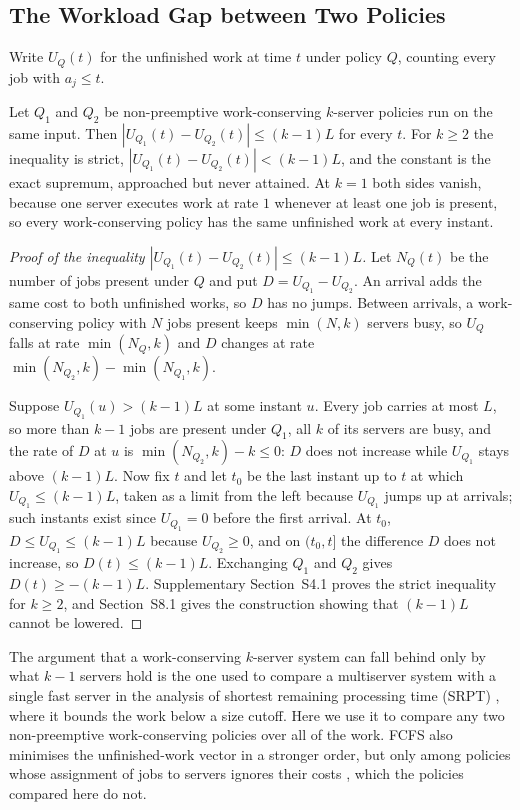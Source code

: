 \subsection{The Workload Gap between Two Policies}
\label{sec:th_gap}

Write $U_Q(t)$ for the unfinished work at time $t$ under policy $Q$, counting every job
with $a_j \le t$.

\begin{lemma}
\label{lem:gap}
Let $Q_1$ and $Q_2$ be non-preemptive work-conserving $k$-server policies run on the same
input. Then $|U_{Q_1}(t) - U_{Q_2}(t)| \le (k-1)L$ for every $t$. For $k \ge 2$ the
inequality is strict, $|U_{Q_1}(t) - U_{Q_2}(t)| < (k-1)L$, and the constant is the exact
supremum, approached but never attained. At $k = 1$ both sides vanish, because one server
executes work at rate $1$ whenever at least one job is present, so every work-conserving
policy has the same unfinished work at every instant.
\end{lemma}

\begin{proof}[Proof of the inequality $|U_{Q_1}(t) - U_{Q_2}(t)| \le (k-1)L$]
Let $N_Q(t)$ be the number of jobs present under $Q$ and put $D = U_{Q_1} - U_{Q_2}$. An
arrival adds the same cost to both unfinished works, so $D$ has no jumps. Between arrivals,
a work-conserving policy with $N$ jobs present keeps $\min(N, k)$ servers busy, so $U_Q$
falls at rate $\min(N_Q, k)$ and $D$ changes at rate $\min(N_{Q_2}, k) - \min(N_{Q_1}, k)$.

Suppose $U_{Q_1}(u) > (k-1)L$ at some instant $u$. Every job carries at most $L$, so more
than $k-1$ jobs are present under $Q_1$, all $k$ of its servers are busy, and the rate of
$D$ at $u$ is $\min(N_{Q_2}, k) - k \le 0$: $D$ does not increase while $U_{Q_1}$ stays above
$(k-1)L$. Now fix $t$ and let $t_0$ be the last instant up to $t$ at which
$U_{Q_1} \le (k-1)L$, taken as a limit from the left because $U_{Q_1}$ jumps up at
arrivals; such instants exist since $U_{Q_1} = 0$ before the first arrival. At $t_0$,
$D \le U_{Q_1} \le (k-1)L$ because $U_{Q_2} \ge 0$, and on $(t_0, t]$ the difference $D$
does not increase, so $D(t) \le (k-1)L$. Exchanging $Q_1$ and $Q_2$ gives
$D(t) \ge -(k-1)L$. Supplementary Section~S4.1 proves the strict inequality for $k \ge 2$,
and Section~S8.1 gives the construction showing that $(k-1)L$ cannot be lowered.
\end{proof}

The argument that a work-conserving $k$-server system can fall behind only by what $k-1$
servers hold is the one used to compare a multiserver system with a single fast server in
the analysis of shortest remaining processing time (SRPT)
\cite{schrage1966srpt,grosof2018srpt}, where it bounds the work below a size cutoff. Here
we use it to compare any two non-preemptive work-conserving policies over all of the
work. FCFS also minimises the unfinished-work
vector in a stronger order, but only among policies whose assignment of jobs to servers
ignores their costs \cite{daley1987fcfs}, which the policies compared here do not.

